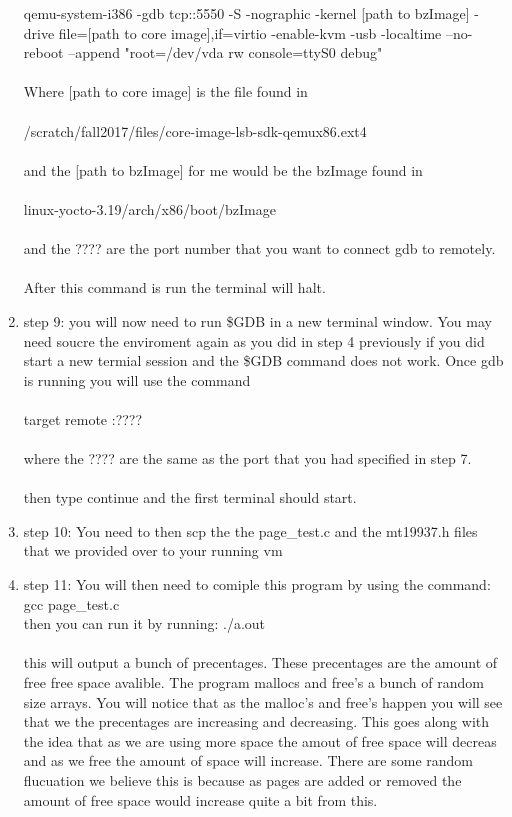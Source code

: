 \documentclass[letterpaper,10pt,titlepage]{article}
\begin{document}
\begin{enumerate}
   qemu-system-i386 -gdb tcp::5550 -S -nographic -kernel [path to bzImage] -drive file=[path to core image],if=virtio -enable-kvm -usb -localtime --no-reboot --append "root=/dev/vda rw console=ttyS0 debug"\\\\
   Where [path to core image] is the file found in\\\\ 
   /scratch/fall2017/files/core-image-lsb-sdk-qemux86.ext4\\\\
   and the [path to bzImage] for me would be the bzImage found in\\\\
   linux-yocto-3.19/arch/x86/boot/bzImage\\\\
   and the ???? are the port number that you want to connect gdb to remotely.\\\\
   After this command is run the terminal will halt.
\item{step 9: }
   you will now need to run \$GDB in a new terminal window. You may need soucre 
   the enviroment again as you did in step 4 previously if you did start a new 
   termial session and the \$GDB command does not work. Once gdb is running you 
   will use the command\\\\
   target remote :????\\\\
   where the ???? are the same as the port that you had specified in step 7.\\\\
   then type continue and the first terminal should start.
\item{step 10:}
   You need to then scp the the page\_test.c and the mt19937.h files that we provided 
   over to your running vm 

\item{step 11:}
   You will then need to comiple this program by using the command: gcc page\_test.c\\
   then you can run it by running: ./a.out\\\\
   this will output a bunch of precentages. These precentages are the amount of free 
   free space avalible. The program mallocs and free's a bunch of random size arrays.
   You will notice that as the malloc's and free's happen you will see that we the 
   precentages are increasing and decreasing. This goes along with the idea that as 
   we are using more space the amout of free space will decreas and as we free the 
   amount of space will increase. There are some random flucuation we believe this is 
   because as pages are added or removed the amount of free space would increase 
   quite a bit from this.


\end{enumerate}
\end{document}

